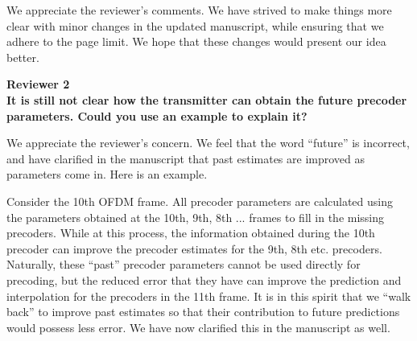 \documentclass[12pt]{letter}
\begin{document}
We appreciate the reviewer's comments. We have strived to make things
more clear with minor changes in the updated manuscript, while
ensuring that we adhere to the page limit. We hope that these changes
would present our idea better.

\textbf{Reviewer 2}\\

\textbf{It is still not clear how the transmitter can obtain the
  future precoder parameters.
  Could you use an example to explain it?}

We appreciate the reviewer's concern. We feel that the word ``future''
is incorrect, and have clarified in the manuscript that past estimates
are improved as parameters come in. Here is an example.

Consider the 10th OFDM frame. All precoder parameters are calculated
using the parameters obtained at the 10th, 9th, 8th ... frames to fill
in the missing precoders. While at this process, the information
obtained during the 10th precoder can improve the precoder estimates
for the 9th, 8th etc. precoders. Naturally, these ``past'' precoder
parameters cannot be used directly for precoding, but the reduced
error that they have can improve the prediction and interpolation for
the precoders in the 11th frame. It is in this spirit that we ``walk
back'' to improve past estimates so that their contribution to future
predictions would possess less error. We have now clarified this in
the manuscript as well.
\end{document}

